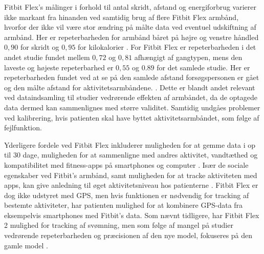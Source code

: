 Fitbit Flex's målinger i forhold til antal skridt, afstand og energiforbrug varierer ikke markant fra hinanden ved samtidig brug af flere Fitbit Flex armbånd, hvorfor der ikke vil være stor ændring på målte data ved eventuel udskiftning af armbånd. Her er repeterbarheden for armbånd båret på højre og venstre håndled $0,90$ for skridt og $0,95$ for kilokalorier \citep{evenson2015}. For Fitbit Flex er repeterbarheden i det andet studie fundet mellem $0,72$ og $0,81$ afhængigt af gangtypen, mens den laveste og højeste repeterbarhed er $0,55$ og $0.89$ for det samlede studie. Her er repeterbarheden fundet ved at se på den samlede afstand forsøgspersonen er gået og den målte afstand for aktivitetsarmbåndene. \citep{kaewkannate2016}. Dette er blandt andet relevant ved dataindsamling til studier vedrørende effekten af armbåndet, da de optagede data dermed kan sammenlignes med større validitet. Samtidig undgåes problemer ved kalibrering, hvis patienten skal have byttet aktivitetsarmbåndet, som følge af fejlfunktion.

Yderligere fordele ved Fitbit Flex inkluderer muligheden for at gemme data i op til $30$ dage, muligheden for at sammenligne med andres aktivitet, vandtæthed og kompatibilitet med fitness-apps på smartphones og computer \citep{kaewkannate2016, fitbitflex}. Især de sociale egenskaber ved Fitbit's armbånd, samt muligheden for at tracke aktiviteten med apps, kan give anledning til øget aktivitetsniveau hos patienterne \citep{karapanos2016, rooksby2014}. Fitbit Flex er dog ikke udstyret med GPS, men hvis funktionen er nødvendig for tracking af bestemte aktiviteter, har patienten mulighed for at kombinere GPS-data fra eksempelvis smartphones med Fitbit's data. Som nævnt tidligere, har Fitbit Flex 2 mulighed for tracking af svømning, men som følge af mangel på studier vedrørende repeterbarheden og præcisionen af den nye model, fokuseres på den gamle model \citep{fitbitflex}.